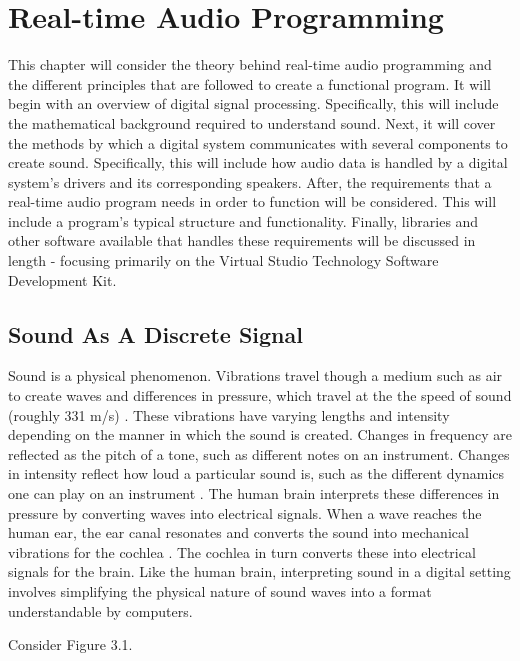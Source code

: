 \chapter{Real-time Audio Programming}
\hspace*{-0.15cm}This chapter will consider the theory behind real-time audio programming and the different principles that are followed to create a functional program. It will begin with an overview of digital signal processing. Specifically, this will include the mathematical background required to understand sound. Next, it will cover the methods by which a digital system communicates with several components to create sound. Specifically, this will include how audio data is handled by a digital system's drivers and its corresponding speakers. After, the requirements that a real-time audio program needs in order to function will be considered. This will include a program's typical structure and functionality. Finally, libraries and other software available that handles these requirements will be discussed in length - focusing primarily on the Virtual Studio Technology Software Development Kit.

\section{Sound As A Discrete Signal}
Sound is a physical phenomenon. Vibrations travel though a medium such as air to create waves and differences in pressure, which travel at the the speed of sound (roughly 331 m/s) \cite{Ling_2016}. These vibrations have varying lengths and intensity depending on the manner in which the sound is created. Changes in frequency are reflected as the pitch of a tone, such as different notes on an instrument. Changes in intensity reflect how loud a particular sound is, such as the different dynamics one can play on an instrument \cite{Ling_2016}. The human brain interprets these differences in pressure by converting waves into electrical signals. When a wave reaches the human ear, the ear canal resonates and converts the sound into mechanical vibrations for the cochlea \cite{Ling_2016}. The cochlea in turn converts these into electrical signals for the brain. Like the human brain, interpreting sound in a digital setting involves simplifying the physical nature of sound waves into a format understandable by computers.

Consider Figure 3.1.

